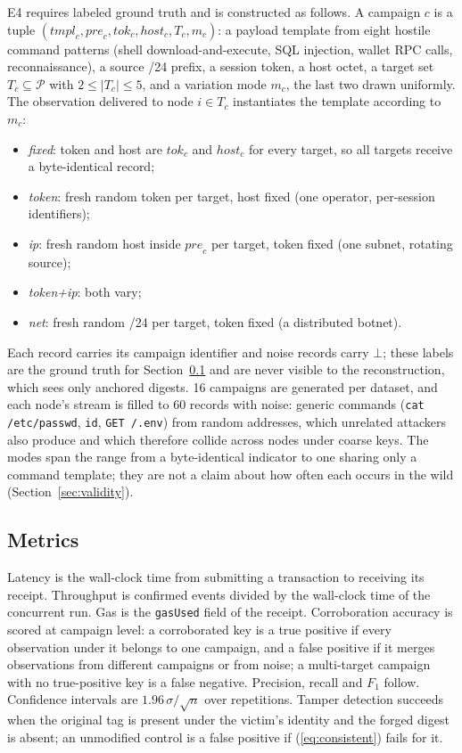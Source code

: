 \documentclass[conference]{IEEEtran}
\begin{document}
E4 requires labeled ground truth and is constructed as follows. A campaign $c$ is a tuple $(\mathit{tmpl}_c, \mathit{pre}_c, \mathit{tok}_c, \mathit{host}_c, T_c, m_c)$: a payload template from eight hostile command patterns (shell download-and-execute, SQL injection, wallet RPC calls, reconnaissance), a source /24 prefix, a session token, a host octet, a target set $T_c\subseteq\mathcal{P}$ with $2\le|T_c|\le 5$, and a variation mode $m_c$, the last two drawn uniformly. The observation delivered to node $i\in T_c$ instantiates the template according to $m_c$:
\begin{itemize}
\item \emph{fixed}: token and host are $\mathit{tok}_c$ and $\mathit{host}_c$ for every target, so all targets receive a byte-identical record;
\item \emph{token}: fresh random token per target, host fixed (one operator, per-session identifiers);
\item \emph{ip}: fresh random host inside $\mathit{pre}_c$ per target, token fixed (one subnet, rotating source);
\item \emph{token+ip}: both vary;
\item \emph{net}: fresh random /24 per target, token fixed (a distributed botnet).
\end{itemize}
Each record carries its campaign identifier and noise records carry $\bot$; these labels are the ground truth for Section~\ref{sec:metrics} and are never visible to the reconstruction, which sees only anchored digests. 16 campaigns are generated per dataset, and each node's stream is filled to 60 records with noise: generic commands (\texttt{cat /etc/passwd}, \texttt{id}, \texttt{GET /.env}) from random addresses, which unrelated attackers also produce and which therefore collide across nodes under coarse keys. The modes span the range from a byte-identical indicator to one sharing only a command template; they are not a claim about how often each occurs in the wild (Section~\ref{sec:validity}).

\subsection{Metrics}
\label{sec:metrics}
Latency is the wall-clock time from submitting a transaction to receiving its receipt. Throughput is confirmed events divided by the wall-clock time of the concurrent run. Gas is the \texttt{gasUsed} field of the receipt. Corroboration accuracy is scored at campaign level: a corroborated key is a true positive if every observation under it belongs to one campaign, and a false positive if it merges observations from different campaigns or from noise; a multi-target campaign with no true-positive key is a false negative. Precision, recall and $F_1$ follow. Confidence intervals are $1.96\,\sigma/\sqrt{n}$ over repetitions. Tamper detection succeeds when the original tag is present under the victim's identity and the forged digest is absent; an unmodified control is a false positive if (\ref{eq:consistent}) fails for it.
\end{document}
